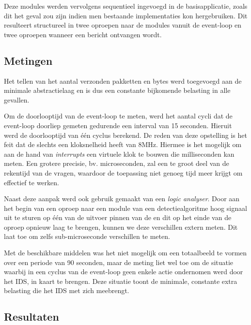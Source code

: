 Deze modules werden vervolgens sequentieel ingevoegd in de basisapplicatie,
zoals dit het geval zou zijn indien men bestaande implementaties kon
hergebruiken. Dit resulteert structureel in twee oproepen naar de modules
vanuit de event-loop en twee oproepen wanneer een bericht ontvangen wordt.

\vspace{-3mm}

\subsection{Metingen}

Het tellen van het aantal verzonden pakketten en bytes werd toegevoegd aan de
minimale abstractielaag en is dus een constante bijkomende belasting in alle
gevallen.

Om de doorlooptijd van de event-loop te meten, werd het aantal cycli dat de
event-loop doorliep gemeten gedurende een interval van 15 seconden. Hieruit
werd de doorlooptijd van \'e\'en cyclus berekend. De reden van deze opstelling
is het feit dat de \mcu slechts een kloksnelheid heeft van 8MHz. Hiermee is het
mogelijk om aan de hand van \emph{interrupts} een virtuele klok te bouwen die
milliseconden kan meten. Een grotere precisie, bv. microseconden, zal een te
groot deel van de rekentijd van de \mcu vragen, waardoor de toepassing niet
genoeg tijd meer krijgt om effectief te werken.

Naast deze aanpak werd ook gebruik gemaakt van een \emph{logic analyser}. Door
aan het begin van een oproep naar een module van een detectiealgoritme hoog
signaal uit te sturen op \'e\'en van de uitvoer pinnen van de \mcu en dit op
het einde van de oproep opnieuw laag te brengen, kunnen we deze verschillen
extern meten. Dit laat toe om zelfs sub-microseconde verschillen te meten.

Met de beschikbare middelen was het niet mogelijk om een totaalbeeld te vormen
over een periode van 90 seconden, maar de meting liet wel toe om de situatie
waarbij in een cyclus van de event-loop geen enkele actie ondernomen werd door
het IDS, in kaart te brengen. Deze situatie toont de minimale, constante extra
belasting die het IDS met zich meebrengt.

\vspace{-3mm}

\subsection{Resultaten}


